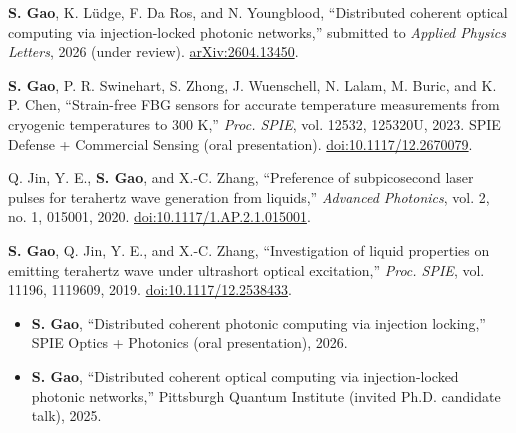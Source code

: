 {\paragraphstyle
\begin{enumerate}[leftmargin=2em,label={[\arabic*]}]
  \item \textbf{S. Gao}, K. L\"udge, F. Da Ros, and N. Youngblood, \textquotedblleft Distributed coherent optical computing via injection-locked photonic networks,\textquotedblright{} submitted to \textit{Applied Physics Letters}, 2026 (under review). \href{https://arxiv.org/abs/2604.13450}{arXiv:2604.13450}.
  \item \textbf{S. Gao}, P. R. Swinehart, S. Zhong, J. Wuenschell, N. Lalam, M. Buric, and K. P. Chen, \textquotedblleft Strain-free FBG sensors for accurate temperature measurements from cryogenic temperatures to 300 K,\textquotedblright{} \textit{Proc. SPIE}, vol. 12532, 125320U, 2023. SPIE Defense + Commercial Sensing (oral presentation). \href{https://doi.org/10.1117/12.2670079}{doi:10.1117/12.2670079}.
  \item Q. Jin, Y. E., \textbf{S. Gao}, and X.-C. Zhang, \textquotedblleft Preference of subpicosecond laser pulses for terahertz wave generation from liquids,\textquotedblright{} \textit{Advanced Photonics}, vol. 2, no. 1, 015001, 2020. \href{https://doi.org/10.1117/1.AP.2.1.015001}{doi:10.1117/1.AP.2.1.015001}.
  \item \textbf{S. Gao}, Q. Jin, Y. E., and X.-C. Zhang, \textquotedblleft Investigation of liquid properties on emitting terahertz wave under ultrashort optical excitation,\textquotedblright{} \textit{Proc. SPIE}, vol. 11196, 1119609, 2019. \href{https://doi.org/10.1117/12.2538433}{doi:10.1117/12.2538433}.
\end{enumerate}
}

{\paragraphstyle
\begin{itemize}[leftmargin=2em]
  \item \textbf{S. Gao}, \textquotedblleft Distributed coherent photonic computing via injection locking,\textquotedblright{} SPIE Optics + Photonics (oral presentation), 2026.
  \item \textbf{S. Gao}, \textquotedblleft Distributed coherent optical computing via injection-locked photonic networks,\textquotedblright{} Pittsburgh Quantum Institute (invited Ph.D. candidate talk), 2025.
\end{itemize}
}
